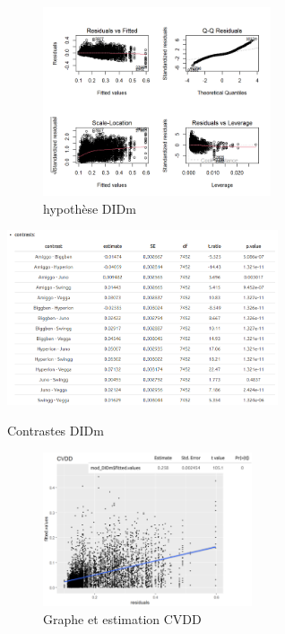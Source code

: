 \newpage

\label{an:DIDm}
\begin{figure}[ht]
\centering
\includegraphics[width=0.6\textwidth]{Image/hypothese DIDm.png}
\caption{hypothèse DIDm}
\end{figure}
\begin{table}[ht]
\centering
\includegraphics[width=0.6\textwidth]{Image/contrast DIDm.png}
\caption{Contrastes DIDm}
\end{table}

\newpage

\label{an:CVDD}
\begin{figure}[ht]
\centering
\includegraphics[width=0.55\textwidth]{Image/CVDD.png}
\caption{Graphe et estimation CVDD}
\end{figure}

\newpage

